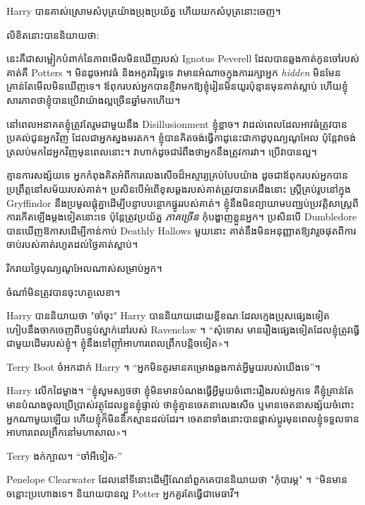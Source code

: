 {{Harry បានគាស់ស្រោមសំបុត្រយ៉ាងប្រុងប្រយ័ត្ន ហើយយកសំបុត្រនោះចេញ។

លិខិតនោះបាននិយាយថា:

\begin{writtenNote}
នេះគឺជាសម្លៀកបំពាក់នៃភាពមើលមិនឃើញរបស់ Ignotus Peverell ដែលបានឆ្លងកាត់កូនចៅរបស់គាត់គឺ Potters ។ មិនដូចអាវធំ និងអក្ខរាវិរុទ្ធទេ វាមានអំណាចក្នុងការរក្សាអ្នក \emph{hidden} មិនមែនគ្រាន់តែមើលមិនឃើញទេ។ ឪពុក​របស់​អ្នក​បាន​ខ្ចី​វា​មក​ឱ្យ​ខ្ញុំ​រៀន​មិន​យូរ​ប៉ុន្មាន​មុន​គាត់​ស្លាប់ ហើយ​ខ្ញុំ​សារភាព​ថា​ខ្ញុំ​បាន​ប្រើ​វា​យ៉ាង​ល្អ​ច្រើន​ឆ្នាំ​មក​ហើយ។

នៅពេលអនាគតខ្ញុំត្រូវតែរួមជាមួយនឹង Disillusionment ខ្ញុំខ្លាច។ វាដល់ពេលដែលអាវធំត្រូវបានប្រគល់ជូនអ្នកវិញ ដែលជាអ្នកស្នងមរតក។ ខ្ញុំបានគិតចង់ធ្វើកាដូនេះជាកាដូបុណ្យណូអែល ប៉ុន្តែវាចង់ត្រលប់មកដៃអ្នកវិញមុនពេលនោះ។ វាហាក់ដូចជារំពឹងថាអ្នកនឹងត្រូវការវា។ ប្រើវាបានល្អ។

គ្មានការសង្ស័យទេ អ្នកកំពុងគិតអំពីការលេងសើចដ៏អស្ចារ្យគ្រប់បែបយ៉ាង ដូចជាឪពុករបស់អ្នកបានប្រព្រឹត្តនៅសម័យរបស់គាត់។ ប្រសិនបើអំពើខុសឆ្គងរបស់គាត់ត្រូវបានគេដឹងនោះ ស្ត្រីគ្រប់រូបនៅក្នុង Gryffindor នឹងប្រមូលផ្តុំគ្នាដើម្បីបន្ទាបបន្ថោកផ្នូររបស់គាត់។ ខ្ញុំនឹងមិនព្យាយាមបញ្ឈប់ប្រវត្តិសាស្ត្រពីការកើតឡើងម្តងទៀតនោះទេ ប៉ុន្តែត្រូវប្រយ័ត្ន \emph{ភាគច្រើន} កុំបង្ហាញខ្លួនអ្នក។ ប្រសិនបើ Dumbledore បានឃើញឱកាសដើម្បីកាន់កាប់ Deathly Hallows មួយនោះ គាត់នឹងមិនអនុញ្ញាតឱ្យវារួចផុតពីការចាប់របស់គាត់រហូតដល់ថ្ងៃគាត់ស្លាប់។

រីករាយថ្ងៃបុណ្យណូអែលណាស់សម្រាប់អ្នក។
\end{writtenNote}

ចំណាំ​មិន​ត្រូវ​បាន​ចុះហត្ថលេខា។

\later

Harry បាននិយាយថា "ចាំចុះ" Harry បាននិយាយដោយខ្លីខណៈដែលក្មេងប្រុសផ្សេងទៀតហៀបនឹងចាកចេញពីបន្ទប់ស្នាក់នៅរបស់ Ravenclaw ។ “សុំទោស មានរឿងផ្សេងទៀតដែលខ្ញុំត្រូវធ្វើជាមួយដើមរបស់ខ្ញុំ។ ខ្ញុំ​នឹង​ទៅ​ញ៉ាំ​អាហារ​ពេល​ព្រឹក​បន្តិច​ទៀត»។

Terry Boot ចំអកដាក់ Harry ។ “អ្នក​មិន​គួរ​មាន​គម្រោង​ឆ្លង​កាត់​អ្វី​មួយ​របស់​យើង​ទេ”។

Harry លើកដៃម្ខាង។ “ខ្ញុំសូមស្បថថា ខ្ញុំមិនមានបំណងធ្វើអ្វីមួយចំពោះរឿងរបស់អ្នកទេ គឺខ្ញុំគ្រាន់តែមានបំណងចូលប្រើប្រាស់វត្ថុដែលខ្លួនខ្ញុំផ្ទាល់ ថាខ្ញុំគ្មានចេតនាលេងសើច ឬមានចេតនាសង្ស័យចំពោះអ្នកណាមួយឡើយ ហើយខ្ញុំក៏មិននឹកស្មានដល់ដែរ។ ចេតនា​ទាំង​នោះ​បាន​ផ្លាស់​ប្តូរ​មុន​ពេល​ខ្ញុំ​ទទួល​ទាន​អាហារ​ពេល​ព្រឹក​នៅ​មហា​សាល​»។

Terry ងក់ក្បាល។ “ចាំអីទៀត-”

Penelope Clearwater ដែលនៅទីនោះដើម្បីណែនាំពួកគេបាននិយាយថា "កុំបារម្ភ" ។ “មិនមានចន្លោះប្រហោងទេ។ និយាយបានល្អ Potter អ្នកគួរតែធ្វើជាមេធាវី។

}}
